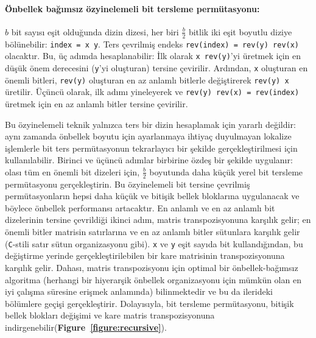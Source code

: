 \documentclass[10pt]{article}
\begin{document}
\paragraph{\"{O}nbellek ba\u{g}{\i}ms{\i}z \"{o}zyinelemeli bit tersleme perm\"{u}tasyonu:}

$b$ bit say{\i}s{\i} e\c{s}it oldu\u{g}unda dizin dizesi, her biri $\frac{b}{2}$ bitlik 
iki e\c{s}it boyutlu diziye b\"{o}l\"{u}nebilir: {\tt index = x~y}. Ters \c{c}evrilmi\c{s} 
endeks {\tt rev(index)~=~rev(y)~rev(x)} olacakt{\i}r. Bu, \"{u}\c{c} ad{\i}mda hesaplanabilir:
\.{I}lk olarak {\tt x~rev(y)}'yi \"{u}retmek i\c{c}in en d\"{u}\c{s}\"{u}k \"{o}nem derecesini 
({\tt y}'yi olu\c{s}turan) tersine \c{c}evirilir. Ard{\i}ndan, {\tt x} olu\c{s}turan en \"{o}nemli bitleri,
{\tt rev(y)} olu\c{s}turan en az anlaml{\i} bitlerle de\u{g}i\c{s}tirerek {\tt rev(y)~x} \"{u}retilir. 
\"{U}\c{c}\"{u}nc\"{u} olarak, ilk ad{\i}m{\i} yineleyerek ve {\tt rev(y)~rev(x)~=~rev(index)} \"{u}retmek i\c{c}in
en az anlaml{\i} bitler tersine \c{c}evirilir.

Bu \"{o}zyinelemeli teknik yaln{\i}zca ters bir dizin hesaplamak i\c{c}in yararl{\i} de\u{g}ildir:
ayn{\i} zamanda \"{o}nbellek boyutu i\c{c}in ayarlanmaya ihtiya\c{c} duyulmayan lokalize i\c{s}lemlerle
bit ters perm\"{u}tasyonun tekrarlay{\i}c{\i} bir \c{s}ekilde ger\c{c}ekle\c{s}tirilmesi i\c{c}in kullan{\i}labilir.
Birinci ve \"{u}\c{c}\"{u}nc\"{u} ad{\i}mlar birbirine \"{o}zde\c{s} bir \c{s}ekilde uygulan{\i}r: 
olas{\i} t\"{u}m en \"{o}nemli bit dizeleri i\c{c}in, $\frac{b}{2}$ boyutunda daha k\"{u}\c{c}\"{u}k 
yerel bit tersleme perm\"{u}tasyonu ger\c{c}ekle\c{s}tirin. Bu \"{o}zyinelemeli 
bit tersine \c{c}evrilmi\c{s} perm\"{u}tasyonlar{\i}n hepsi daha k\"{u}\c{c}\"{u}k ve biti\c{s}ik bellek bloklar{\i}na
uygulanacak ve b\"{o}ylece \"{o}nbellek performans{\i} artacakt{\i}r. En anlaml{\i} ve en az anlaml{\i}
bit dizelerinin tersine \c{c}evrildi\u{g}i ikinci ad{\i}m, matris transpozisyonuna kar\c{s}{\i}l{\i}k gelir;
en \"{o}nemli bitler matrisin sat{\i}rlar{\i}na ve en az anlaml{\i} bitler s\"{u}tunlara kar\c{s}{\i}l{\i}k gelir
({\tt C}-stili sat{\i}r s\"{u}tun organizasyonu gibi). {\tt x} ve {\tt y} e\c{s}it say{\i}da bit 
kulland{\i}\u{g}{\i}ndan, bu de\u{g}i\c{s}tirme yerinde ger\c{c}ekle\c{s}tirilebilen bir kare matrisinin 
transpozisyonuna kar\c{s}{\i}l{\i}k gelir. Dahas{\i}, matris transpozisyonu i\c{c}in optimal bir
\"{o}nbellek-ba\u{g}{\i}ms{\i}z algoritma (herhangi bir hiyerar\c{s}ik \"{o}nbellek organizasyonu i\c{c}in
m\"{u}mk\"{u}n olan en iyi \c{c}al{\i}\c{s}ma s\"{u}resine eri\c{s}mek anlam{\i}nda)
bilinmektedir ve bu da ilerideki b\"{o}l\"{u}mlere ge\c{c}i\c{s}i ger\c{c}ekle\c{s}tirir\cite{prokop:cache}. 
Dolay{\i}s{\i}yla, bit tersleme perm\"{u}tasyonu, biti\c{s}ik bellek bloklar{\i} de\u{g}i\c{s}imi ve kare matris 
transpozisyonuna indirgenebilir({\bf Figure~\ref{figure:recursive}}).
\end{document}
